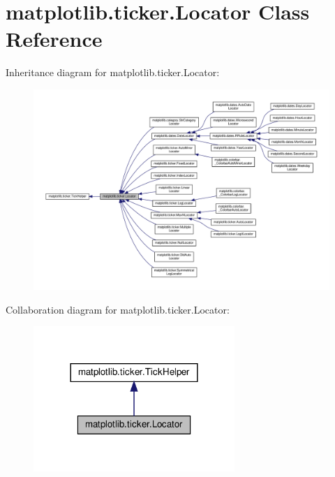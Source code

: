 \hypertarget{classmatplotlib_1_1ticker_1_1Locator}{}\section{matplotlib.\+ticker.\+Locator Class Reference}
\label{classmatplotlib_1_1ticker_1_1Locator}


Inheritance diagram for matplotlib.\+ticker.\+Locator\+:
\nopagebreak
\begin{figure}[H]
\begin{center}
\leavevmode
\includegraphics[width=350pt]{classmatplotlib_1_1ticker_1_1Locator__inherit__graph}
\end{center}
\end{figure}


Collaboration diagram for matplotlib.\+ticker.\+Locator\+:
\nopagebreak
\begin{figure}[H]
\begin{center}
\leavevmode
\includegraphics[width=216pt]{classmatplotlib_1_1ticker_1_1Locator__coll__graph}
\end{center}
\end{figure}
